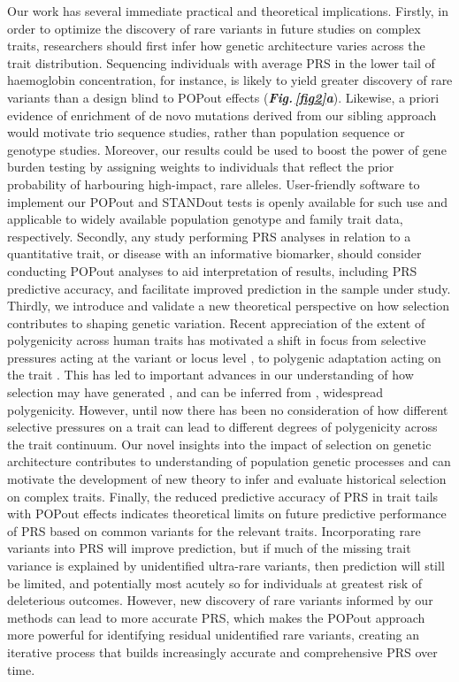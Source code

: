 \documentclass[12pt]{zHenriquesLab-StyleBioRxiv}
\newcommand\dref[2]{\normalsize{\textbf{\textit{Fig.\,\ref{#1}#2}}}\normalsize{}}
\begin{document}
Our work has several immediate practical and theoretical implications. 
Firstly, in order to optimize the discovery of rare variants in future 
studies on complex traits, researchers should first infer how genetic 
architecture varies across the trait distribution. 
Sequencing individuals with average PRS in the lower tail of 
haemoglobin concentration, for instance, is likely to yield greater 
discovery of rare variants than a design blind to POPout 
effects (\dref{fig2}{a}). Likewise, a priori evidence of enrichment of de 
novo mutations derived from our sibling approach \cite{Souaiaia2024} 
would motivate trio sequence studies, rather than population 
sequence or genotype studies. Moreover, our results could be 
used to boost the power of gene burden testing \cite{Lee2012}
by assigning weights to individuals that reflect the prior probability 
of harbouring high-impact, rare alleles. User-friendly software 
to implement our POPout and STANDout tests is openly available 
for such use and applicable to widely available population 
genotype and family trait data, respectively. Secondly, 
any study performing PRS analyses in relation to a quantitative trait, 
or disease with an informative biomarker, should consider 
conducting POPout analyses to aid interpretation of results, 
including PRS predictive accuracy, and facilitate improved prediction 
in the sample under study. Thirdly, we introduce and validate a new 
theoretical perspective on how selection contributes 
to shaping genetic variation. Recent appreciation of the extent 
of polygenicity across human traits has motivated a shift 
in focus from selective pressures acting at the 
variant or locus level \cite{Sabeti2002,Paul2008}, 
to polygenic adaptation acting on the trait \cite{Pritchard2010, Hollinger2019}. 
This has led to important advances in our understanding 
of how selection may have generated \cite{Oconnor2019}, 
and can be inferred from \cite{Barghi2020}, 
widespread polygenicity. However, until now there has been 
no consideration of how different selective pressures on a trait 
can lead to different degrees of polygenicity across the trait continuum. 
Our novel insights into the impact of selection on genetic architecture 
contributes to understanding of population genetic processes and can motivate 
the development of new theory to infer and evaluate historical selection on complex traits. 
Finally, the reduced predictive accuracy of PRS in trait tails 
with POPout effects indicates theoretical limits on future predictive 
performance of PRS based on common variants for the relevant traits. 
Incorporating rare variants into PRS will improve prediction, but if much of 
the missing trait variance is explained by unidentified ultra-rare variants, 
then prediction will still be limited, and potentially most acutely 
so for individuals at greatest risk of deleterious outcomes. 
However, new discovery of rare variants informed by our methods can lead 
to more accurate PRS, which makes the POPout approach more powerful for 
identifying residual unidentified rare variants, creating an iterative 
process that builds increasingly accurate and comprehensive PRS over time.
\end{document}
